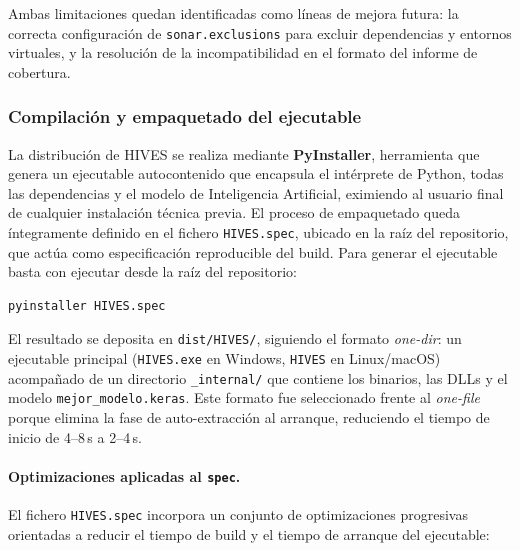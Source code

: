 Ambas limitaciones quedan identificadas como líneas de mejora futura: la
correcta configuración de \texttt{sonar.exclusions} para excluir dependencias
y entornos virtuales, y la resolución de la incompatibilidad en el formato del
informe de cobertura.


\subsubsection*{Compilación y empaquetado del ejecutable}

La distribución de HIVES se realiza mediante \textbf{PyInstaller\cite{pyinstaller2024docs}}, herramienta
que genera un ejecutable autocontenido que encapsula el intérprete de Python,
todas las dependencias y el modelo de Inteligencia Artificial, eximiendo al
usuario final de cualquier instalación técnica previa. El proceso de empaquetado
queda íntegramente definido en el fichero \texttt{HIVES.spec}, ubicado en la
raíz del repositorio, que actúa como especificación reproducible del build.
Para generar el ejecutable basta con ejecutar desde la raíz del repositorio:

\begin{verbatim}
pyinstaller HIVES.spec
\end{verbatim}

El resultado se deposita en \texttt{dist/HIVES/}, siguiendo el formato
\textit{one-dir}: un ejecutable principal (\texttt{HIVES.exe} en Windows,
\texttt{HIVES} en Linux/macOS) acompañado de un directorio \texttt{\_internal/}
que contiene los binarios, las DLLs y el modelo \texttt{mejor\_modelo.keras}.
Este formato fue seleccionado frente al \textit{one-file} porque elimina la fase
de auto-extracción al arranque, reduciendo el tiempo de inicio de \mbox{4--8\,s}
a \mbox{2--4\,s}.

\paragraph{Optimizaciones aplicadas al \texttt{spec}.}
El fichero \texttt{HIVES.spec} incorpora un conjunto de optimizaciones
progresivas orientadas a reducir el tiempo de build y el tiempo de arranque
del ejecutable:

